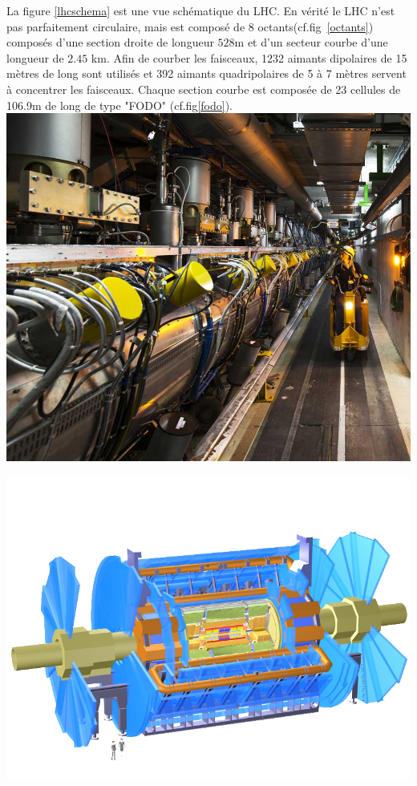 La figure \ref{lhcschema} est une vue schématique du LHC. En vérité le LHC n'est pas parfaitement circulaire, mais est composé de $8$ octants(cf.fig~\ref{octants}) composés d'une section droite de longueur $528$m et d'un secteur courbe d'une longueur de $2.45$ km. Afin de courber les faisceaux, 1232 aimants dipolaires de 15 mètres de long sont utilisés et 392 aimants quadripolaires de 5 à 7 mètres servent à concentrer les faisceaux. Chaque section courbe est composée de 23 cellules de 106.9m de long de type "FODO" (cf.fig\ref{fodo}).
\marginpar
{
	\includegraphics[width=\marginparwidth]{LHC/RF.jpg}
	\label{radio}
}

\marginpar
{
	\includegraphics[width=\marginparwidth]{LHC/atlas.png}
	\label{atlas}
}

